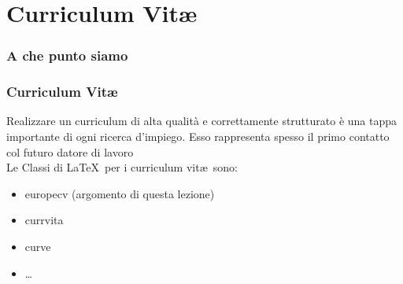 \documentclass[svgnames,%
	ucs,%
	pdftex]{guitbeamer}
\begin{document}
\section{Curriculum Vit\ae}
\begin{frame}
  \frametitle{A che punto siamo}
\end{frame}
\begin{frame}
  \frametitle{Curriculum Vit\ae}
	Realizzare un curriculum di alta qualit\`a e correttamente strutturato \`e una tappa importante di ogni ricerca d'impiego. Esso rappresenta spesso il primo contatto col futuro datore di lavoro\\
  \bigskip
	Le Classi di \LaTeX\ per i curriculum vit\ae\ sono:
	\begin{itemize}
		\item europecv (argomento di questa lezione)
		\item currvita
		\item curve
		\item \dots
	\end{itemize}
\end{frame}
\end{document}
